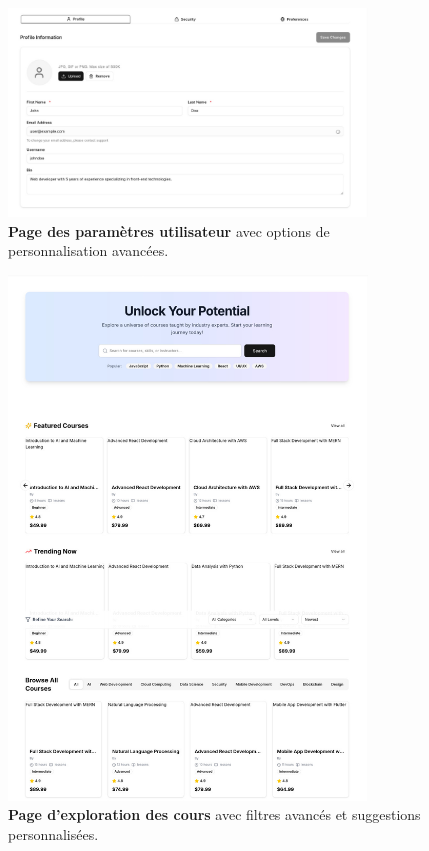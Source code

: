 \begin{figure}[h!]
  \centering
  \includegraphics[width=0.85\textwidth,keepaspectratio]{old-reports/week_4_img/settings.jpeg}
  \caption{\textbf{Page des paramètres utilisateur} avec options de personnalisation avancées.}
  \label{fig:user_settings}
\end{figure}

\begin{figure}[h!]
  \centering
  \includegraphics[width=0.85\textwidth,keepaspectratio]{old-reports/week_4_img/explor.jpeg}
  \caption{\textbf{Page d'exploration des cours} avec filtres avancés et suggestions personnalisées.}
  \label{fig:course_explorer}
\end{figure}

